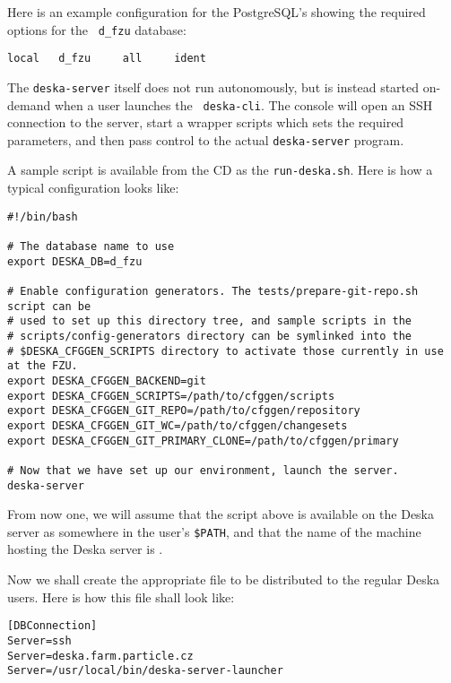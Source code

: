 \documentclass[deska]{subfiles}
\begin{document}
Here is an example configuration for the PostgreSQL's  showing the required options for the {\tt
d\_fzu} database:

\begin{verbatim}
local   d_fzu     all     ident
\end{verbatim}

The {\tt deska-server} itself does not run autonomously, but is instead started on-demand when a user launches the {\tt
deska-cli}.  The console will open an SSH connection to the server, start a wrapper scripts which sets the required
parameters, and then pass control to the actual {\tt deska-server} program.

A sample script is available from the CD as the {\tt run-deska.sh}.  Here is how a typical configuration looks like:

\label{sec:deska-server-wrapper}
\begin{verbatim}
#!/bin/bash

# The database name to use
export DESKA_DB=d_fzu

# Enable configuration generators. The tests/prepare-git-repo.sh script can be
# used to set up this directory tree, and sample scripts in the
# scripts/config-generators directory can be symlinked into the
# $DESKA_CFGGEN_SCRIPTS directory to activate those currently in use at the FZU.
export DESKA_CFGGEN_BACKEND=git
export DESKA_CFGGEN_SCRIPTS=/path/to/cfggen/scripts
export DESKA_CFGGEN_GIT_REPO=/path/to/cfggen/repository
export DESKA_CFGGEN_GIT_WC=/path/to/cfggen/changesets
export DESKA_CFGGEN_GIT_PRIMARY_CLONE=/path/to/cfggen/primary

# Now that we have set up our environment, launch the server.
deska-server
\end{verbatim}

From now one, we will assume that the script above is available on the Deska server as 
somewhere in the user's {\tt \$PATH}, and that the name of the machine hosting the Deska server is
.

Now we shall create the appropriate  file to be distributed to the regular Deska users.  Here is how
this file shall look like:

\begin{verbatim}
[DBConnection]
Server=ssh
Server=deska.farm.particle.cz
Server=/usr/local/bin/deska-server-launcher
\end{verbatim}

\end{document}
